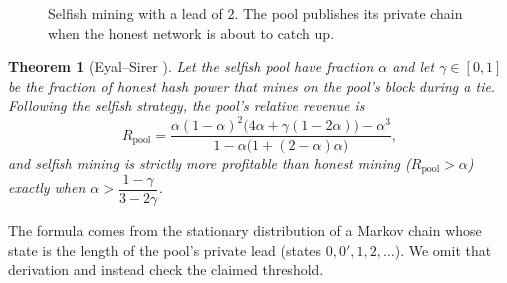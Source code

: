 \documentclass[11pt,a4paper]{article}
\newenvironment{formal}{\par\smallskip}{\par\smallskip}
\theoremstyle{definition}
\theoremstyle{plain}
\newtheorem{theorem}[definition]{Theorem}
\theoremstyle{remark}
\begin{document}
\begin{figure}[htbp]
\centering
{}
\caption{Selfish mining with a lead of $2$. The pool publishes its private chain when the honest network is about to catch up.}
\end{figure}

\begin{formal}
\begin{theorem}[Eyal--Sirer \cite{ES14}]
Let the selfish pool have fraction $\alpha$ and let $\gamma\in[0,1]$ be the fraction of honest hash power that mines on the pool's block during a tie. Following the selfish strategy, the pool's relative revenue is
$$R_{\text{pool}}=\frac{\alpha(1-\alpha)^2\big(4\alpha+\gamma(1-2\alpha)\big)-\alpha^3}{1-\alpha\big(1+(2-\alpha)\alpha\big)},$$
and selfish mining is strictly more profitable than honest mining ($R_{\text{pool}}>\alpha$) exactly when $\alpha>\dfrac{1-\gamma}{3-2\gamma}$.
\end{theorem}
The formula comes from the stationary distribution of a Markov chain whose state is the length of the pool's private lead (states $0,0',1,2,\dots$). We omit that derivation and instead check the claimed threshold.
\end{formal}
\end{document}
